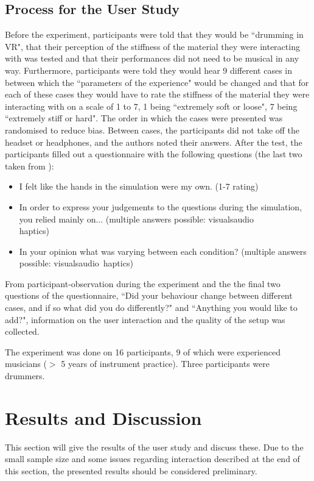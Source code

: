    \subsection{Process for the User Study}
    Before the experiment, participants were told that they would be ``drumming in VR", that their perception of the stiffness of the material they were interacting with was tested and that their performances did not need to be musical in any way. Furthermore, participants were told they would hear 9 different cases in between which the ``parameters of the experience" would be changed and that for each of these cases they would have to rate the stiffness of the material they were interacting with on a scale of 1 to 7, 1 being ``extremely soft or loose", 7 being ``extremely stiff or hard". The order in which the cases were presented was randomised to reduce bias. Between cases, the participants did not take off the headset or headphones, and the authors noted their answers. After the test, the participants filled out a questionnaire with the following questions (the last two taken from \cite{avanzini2006}):
    
    \begin{itemize}
        \item I felt like the hands in the simulation were my own. (1-7 rating)
        \item In order to express your judgements to the questions during the simulation, you relied mainly on... (multiple answers possible: visuals\textbar audio\textbar\\
         haptics)
        \item In your opinion what was varying between each condition? (multiple answers possible: visuals\textbar audio\textbar\ haptics)
    \end{itemize}
    From participant-observation during the experiment and the the final two questions of the questionnaire, ``Did your behaviour change between different cases, and if so what did you do differently?" and ``Anything you would like to add?", information on the user interaction and the quality of the setup was collected.
    
    The experiment was done on 16 participants, 9 of which were experienced musicians ($>$ 5 years of instrument practice). Three participants were drummers. 
    
    \section{Results and Discussion}\label{sec:resDisc}
    This section will give the results of the user study and discuss these. Due to the small sample size and some issues regarding interaction described at the end of this section, the presented results should be considered preliminary.
    
